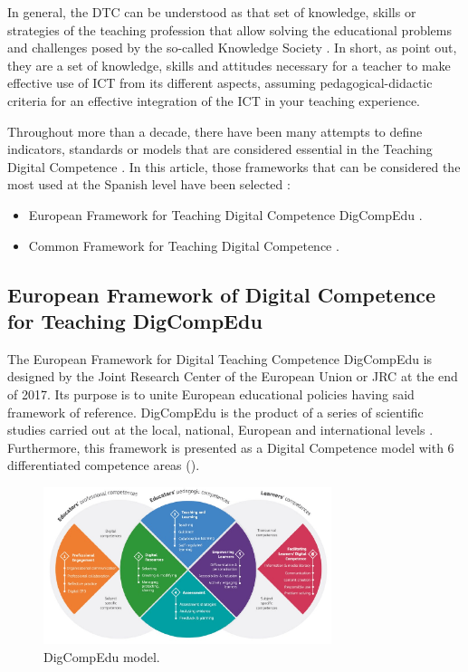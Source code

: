 \documentclass{textolivre}
\begin{document}
In general, the DTC can be understood as that set of knowledge, skills or
strategies of the teaching profession that allow solving the educational
problems and challenges posed by the so-called Knowledge Society \cite{prendesEspinosa2011,CaberoAlmenara2020}.
In short, as \textcite{duranCuartero2019} point out, they are a set of knowledge, skills and attitudes
necessary for a teacher to make effective use of ICT from its different
aspects, assuming pedagogical-didactic criteria for an effective integration of
the ICT in your teaching experience.

Throughout more than a decade, there have been many attempts to define
indicators, standards or models that are considered essential in the Teaching
Digital Competence \cite{CaberoAlmenara2020,caberoAlmenara2020b}.
In this article, those frameworks that can be considered the most used
at the Spanish level have been selected \cite{caberoAlmenara2019a,lazaroCantabrana2019,padillaHernandez2019,rodrguezGarca2019,silva2019,caberoAlmenara2019b}:

\begin{itemize}
\item European Framework for Teaching Digital Competence DigCompEdu \cite{redecker2017}.
\item Common Framework for Teaching Digital Competence \cite{intef2017}.
\end{itemize}


\subsection{European Framework of Digital Competence for Teaching DigCompEdu}\label{sec-euro-fram}

The European Framework for Digital Teaching Competence DigCompEdu is designed
by the Joint Research Center of the European Union or JRC \cite{redecker2017}
at the end of 2017. Its purpose is to unite European educational policies
having said framework of reference. DigCompEdu is the product of a series of
scientific studies carried out at the local, national, European and
international levels \cite{caberoAlmenara2020a,Ghomi2019,redecker2017,reisolu2020}.
Furthermore, this framework is presented as a Digital Competence
model with 6 differentiated competence areas ().

\begin{figure}[htbp]
 \centering
 \includegraphics[width=0.75\textwidth]{fig01.png}
 \caption{DigCompEdu model.}
 \label{fig01}
\end{figure}
\end{document}
